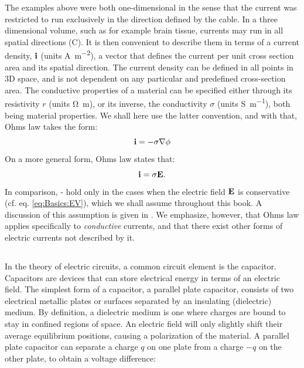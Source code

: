 The examples above were both one-dimensional in the sense that the current was restricted to run exclusively in the direction defined by the cable. In a three dimensional volume, such as for example brain tissue, currents may run in all spatial directions (C). It is then convenient to describe them in terms of a current density, ${\bf i}$ (units \si{\ampere\per\square\metre}), a vector that defines the current per unit cross section area and its spatial direction. The current density can be defined in all points in 3D space, and is not dependent on any particular and predefined cross-section area. The conductive properties of a material can be specified either through its resistivity $r$ (units \si{\ohm\metre}), or its inverse, the conductivity $\sigma$ (units \si{\siemens\per\metre}), both being material properties. We shall here use the latter convention, and with that, Ohms law  takes the form:
\begin{equation}
{\bf i} = - \sigma {\bf \nabla} \phi
\label{eq:Basics:Ohm_3D_phi}
\end{equation}
%
On a more general form, Ohms law states that:
\begin{equation}
{\bf i} = \sigma {\bf E}.
\label{eq:Basics:Ohm_general}
\end{equation}
In comparison, - hold only in the cases when the electric field ${\bf E}$ is conservative (cf. eq. \ref{eq:Basics:EV}),  which we shall assume throughout this book. A discussion of this assumption is given in . We emphasize, however, that Ohms law applies specifically to \textit{conductive} currents, and that there exist other forms of electric currents not described by it.


\subsection{}
\label{sec:Basics:CapacitiveCurrent} 
In the theory of electric circuits, a common circuit element is the capacitor. Capacitors are devices that can store electrical energy in terms of an electric field.
The simplest form of a capacitor, a parallel plate capacitor, consists of two electrical metallic plates or surfaces separated by an insulating (dielectric) medium.  By definition, a dielectric medium is one where charges are bound to stay in confined regions of space. An electric field will only slightly shift their average equilibrium positions, causing a polarization of the material. A parallel plate capacitor can separate a charge $q$ on one plate from a charge $-q$ on the other plate, to obtain a voltage difference:

